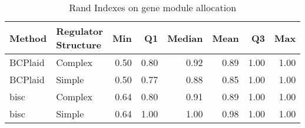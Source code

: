 \begin{table}[ht]
\caption{Rand Indexes on gene module allocation}
\vspace{1.5cm}
\centering
\begin{tabular}{llrrrrrr}
  \toprule
Method & \makecell{Regulator \\ Structure} & Min & Q1 & Median & Mean & Q3 & Max \\ 
  \midrule
BCPlaid & Complex & 0.50 & 0.80 & 0.92 & 0.89 & 1.00 & 1.00 \\ 
  BCPlaid & Simple & 0.50 & 0.77 & 0.88 & 0.85 & 1.00 & 1.00 \\ 
  bisc & Complex & 0.64 & 0.80 & 0.91 & 0.89 & 1.00 & 1.00 \\ 
  bisc & Simple & 0.64 & 1.00 & 1.00 & 0.98 & 1.00 & 1.00 \\ 
   \bottomrule
\end{tabular}
\end{table}
